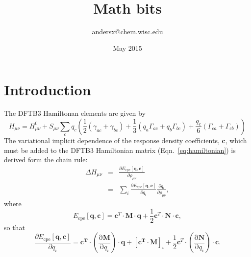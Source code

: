 \documentclass{article}
\title{Math bits}
\author{andersx@chem.wisc.edu}
\date{May 2015}
\begin{document}

\section{Introduction}
The DFTB3 Hamiltonan elements are given by\cite{cpekaminski}
\begin{equation}
    H_{\mu\nu} = H^0_{\mu\nu} + S_{\mu\nu} \sum_c q_c \left(
        \frac{1}{2} \left( \gamma_{ac} + \gamma_{bc} \right) +
        \frac{1}{3} \left( q_a \Gamma_{ac} + q_b \Gamma_{bc} \right) +
        \frac{q_c}{6} \left( \Gamma_{ca} + \Gamma_{cb} \right) 
    \right)
    \label{eq:hamiltonian}
\end{equation}
The variational implicit dependence of the response density coefficients, $\mathbf{c}$, which must be added to the DFTB3 Hamiltonian matrix (Eqn.~\ref{eq:hamiltonian}) is derived form the chain rule:
\begin{eqnarray}
    \Delta H_{\mu\nu} &=& \frac{\partial E_{\mathrm{cpe}}\left[\mathbf{q}, \mathbf{c}\right]}{\partial \rho_{\mu\nu}}\\
    &=& \sum_i \frac{\partial E_{\mathrm{cpe}}\left[\mathbf{q}, \mathbf{c}\right]}{\partial q_i} 
    \frac{\partial q_i}{\partial \rho_{\mu\nu}},
\end{eqnarray}
where
\begin{equation}
    E_{\mathrm{cpe}}\left[\mathbf{q}, \mathbf{c}\right] = \mathbf{c}^T \cdot \mathbf{M} \cdot \mathbf{q} + \frac{1}{2} \mathbf{c}^T \cdot \mathbf{N} \cdot \mathbf{c},
\end{equation}
so that
\begin{equation}
    \frac{\partial E_{\mathrm{cpe}}\left[\mathbf{q}, \mathbf{c}\right]}{\partial q_i} = 
    \mathbf{c^T} \cdot \left( \frac{\mathrm{\partial}\mathbf{M}}{\mathrm{\partial}q_i}\right) \cdot \mathbf{q} 
    + [\mathbf{c^T}  \cdot \mathbf{M}]_i + \frac{1}{2}\mathbf{c}^T \cdot \left( \frac{\mathrm{\partial}\mathbf{N}}{\mathrm{\partial}q_i}\right) \cdot \mathbf{c}. 
\end{equation}













\end{document}
